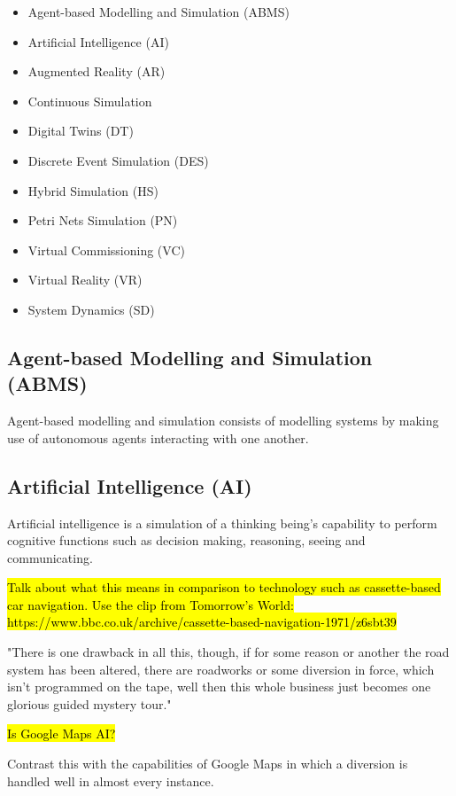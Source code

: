 \documentclass{article}
\begin{document}
\begin{itemize}
    \item Agent-based Modelling and Simulation (ABMS)
    \item Artificial Intelligence (AI)
    \item Augmented Reality (AR)
    \item Continuous Simulation
    \item Digital Twins (DT)
    \item Discrete Event Simulation (DES)
    \item Hybrid Simulation (HS)
    \item Petri Nets Simulation (PN)
    \item Virtual Commissioning (VC)
    \item Virtual Reality (VR)    
    \item System Dynamics (SD)    
\end{itemize}

\subsection{Agent-based Modelling and Simulation (ABMS)}

Agent-based modelling and simulation consists of modelling systems by making use of autonomous agents interacting with one another. \cite{1574234}

\subsection{Artificial Intelligence (AI)}

Artificial intelligence is a simulation of a thinking being's capability to perform cognitive functions such as decision making, reasoning, seeing and communicating.


\hl{Talk about what this means in comparison to technology such as cassette-based car navigation. Use the clip from Tomorrow's World: https://www.bbc.co.uk/archive/cassette-based-navigation-1971/z6sbt39}

"There is one drawback in all this, though, if for some reason or another the road system has been altered, there are roadworks or some diversion in force, which isn't programmed on the tape, well then this whole business just becomes one glorious guided mystery tour."

\hl{Is Google Maps AI?}

Contrast this with the capabilities of Google Maps in which a diversion is handled well in almost every instance.
\end{document}
